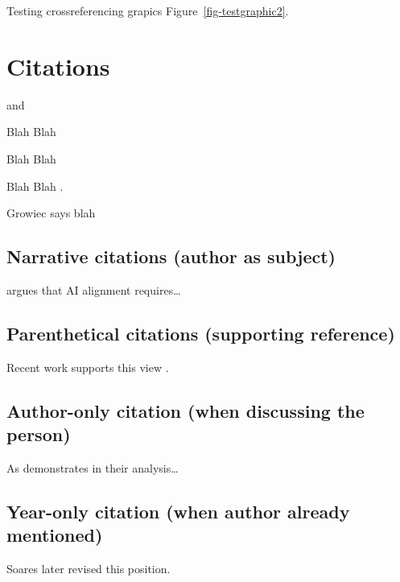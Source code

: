 \documentclass[
  11pt,
  letterpaper,
]{book}
\begin{document}
Testing crossreferencing grapics Figure~\ref{fig-testgraphic2}.

\section*{Citations}\label{sec-citations}


\textcite{soares2014}

\autocite{soares2014} and \autocite{knuth1984}

Blah Blah \autocites[see][33-35]{knuth1984}[also][chap.~1]{growiec2024}

Blah Blah \autocite[33-35, 38-39 and passim]{knuth1984}

Blah Blah \autocite{growiec2024,knuth1984}.

Growiec says blah \autocite*{growiec2024}

\subsection{Narrative citations (author as
subject)}\label{narrative-citations-author-as-subject}

\textcite{soares2014} argues that AI alignment requires\ldots{}

\subsection{Parenthetical citations (supporting
reference)}\label{parenthetical-citations-supporting-reference}

Recent work supports this view \autocite{soares2014,knuth1984}.

\subsection{Author-only citation (when discussing the
person)}\label{author-only-citation-when-discussing-the-person}

As \autocite*{soares2014} demonstrates in their analysis\ldots{}

\subsection{Year-only citation (when author already
mentioned)}\label{year-only-citation-when-author-already-mentioned}

Soares \autocite*{soares2014} later revised this position.
\end{document}

